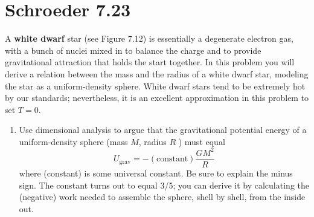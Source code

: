 \documentclass[10pt]{article}
\begin{document}
	\section*{Schroeder 7.23}
	A \textbf{white dwarf} star (see Figure 7.12) is essentially a degenerate electron gas, with a bunch of 
	nuclei mixed in to balance the charge and to provide gravitational attraction that holds the start 
	together. In this problem you will derive a relation between the mass and the radius of a white dwarf 
	star, modeling the star as a uniform-density sphere. White dwarf stars tend to be extremely hot by our 
	standards; nevertheless, it is an excellent approximation in this problem to set \( T = 0 \).
	\begin{enumerate}[label=\alph*)]
		\item Use dimensional analysis to argue that the gravitational potential energy of a uniform-density 
			sphere (mass \( M \), radius \( R \) ) must equal 
			\[
				U_{\text{grav}} = -(\text{constant}) \frac{GM^2}{R}
			\] 
			where (constant) is some universal constant. Be sure to explain the minus sign. The constant
			turns out to equal 3/5; you can derive it by calculating the (negative) work needed to 
			assemble the sphere, shell by shell, from the inside out.


\end{enumerate}
\end{document}

